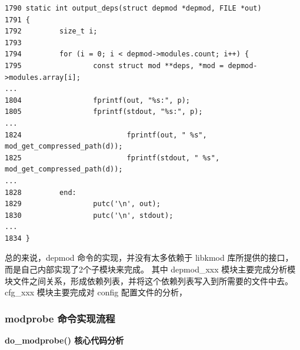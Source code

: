 \documentclass[11pt,a4paper]{article}
\begin{document}
{\begin{shaded}\begin{verbatim}
1790 static int output_deps(struct depmod *depmod, FILE *out)
1791 {
1792         size_t i;
1793 
1794         for (i = 0; i < depmod->modules.count; i++) {
1795                 const struct mod **deps, *mod = depmod->modules.array[i];
...
1804                 fprintf(out, "%s:", p);
1805                 fprintf(stdout, "%s:", p);
...
1824                         fprintf(out, " %s", mod_get_compressed_path(d));
1825                         fprintf(stdout, " %s", mod_get_compressed_path(d));
...
1828         end:
1829                 putc('\n', out);
1830                 putc('\n', stdout);
... 
1834 }
\end{verbatim}\end{shaded}}
总的来说，depmod 命令的实现，并没有太多依赖于 libkmod
库所提供的接口，而是自己内部实现了2个子模块来完成。 其中 depmod\_xxx
模块主要完成分析模块文件之间关系，形成依赖列表，并将这个依赖列表写入到所需要的文件中去。
cfg\_xxx 模块主要完成对 config 配置文件的分析，

\subsubsection{modprobe 命令实现流程}

\textbf{do\_modprobe() 核心代码分析}
\end{document}
